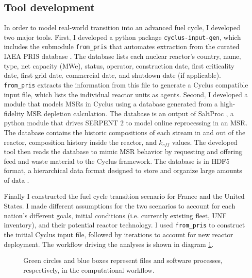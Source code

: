 \subsection{Tool development}
In order to model real-world transition into an advanced
fuel cycle, I developed two major tools. First, I developed a python package \texttt{cyclus-input-gen},
which includes the submodule \texttt{from\_pris}
that automates extraction from the curated \gls{IAEA} \gls{PRIS} database
\cite{iaea_nuclear_2018}. The database lists each nuclear reactor's
country, name, type, net capacity (\gls{MWe}), status, operator, construction
date, first criticality date, first grid date, commercial date, and shutdown
date (if applicable). \texttt{from\_pris} extracts the information from this file
to generate a Cyclus compatible input file, which lists the individual
reactor units as agents. Second, I developed a module that models \glspl{MSR}
in Cyclus using a database generated from a high-fidelity \gls{MSR} depletion calculation.
The database is an output of SaltProc \cite{rykhlevskii_arfc/saltproc:_2018}, a python
module that drives
SERPENT 2 \cite{leppanen_serpentcontinuous-energy_2013} to model online reprocessing in an \gls{MSR}.
The database contains the historic compositions of each stream in and out of the reactor,
composition history inside the reactor, and $k_{eff}$ values. The developed tool then
reads the database to mimic \gls{MSR} behavior by requesting and offering
feed and waste material to the Cyclus framework. The database is in HDF5
format, a hierarchical data format designed to store and organize
large amounts of data \cite{the_hdf_group_hierarchical_1997}.

Finally I constructed the fuel cycle transition scenario for France and the United States.
I made different assumptions for the two scenarios to account for each nation's different goals,
initial conditions (i.e. currently existing fleet, \gls{UNF} inventory), and their potential reactor
technology. I used \texttt{from\_pris} to construct the initial Cyclus input file,
followed by iterations to account for new reactor deployment. The workflow driving the analyses is shown in diagram \ref{diag:workflow}.


\begin{figure}
        \centering
{}
\caption{Green circles and blue boxes represent files and software 
processes, respectively, in the computational workflow.}
\label{diag:workflow}
\end{figure}


